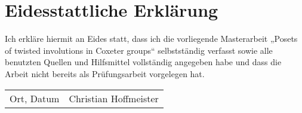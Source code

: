\chapter*{Eidesstattliche Erklärung}

Ich erkläre hiermit an Eides statt, dass ich die vorliegende Masterarbeit „Posets of twisted involutions in Coxeter groups“ selbstständig verfasst sowie alle benutzten Quellen und Hilfsmittel vollständig angegeben habe und dass die Arbeit nicht bereits als Prüfungsarbeit vorgelegen hat. 

\vspace*{1.75cm}

\noindent \begin{tabularx}{\linewidth}{Xr}
\hline
{\footnotesize Ort, Datum} & {\footnotesize Christian Hoffmeister} \\
\end{tabularx}